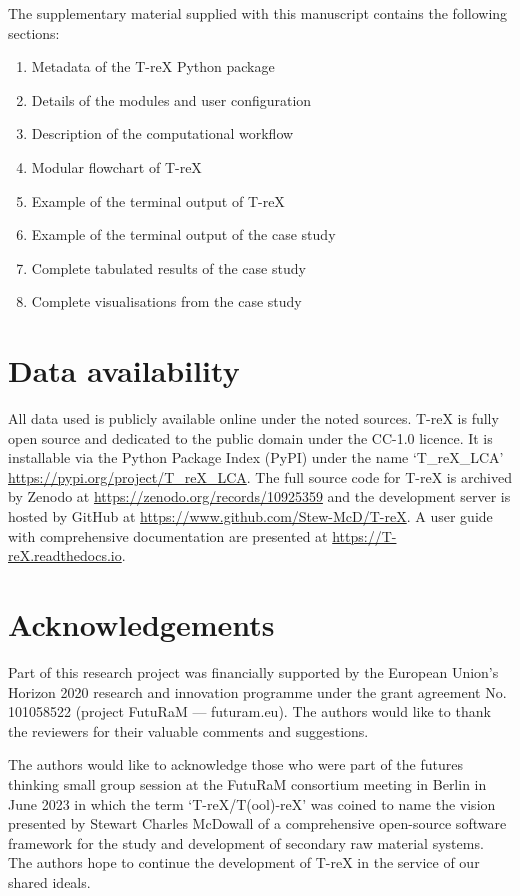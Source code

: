 \documentclass[a4paper,fleqn]{cas-dc}
\begin{document}
\appendix
The supplementary material supplied with this manuscript contains the
following sections:
\begin{enumerate}
	\item Metadata of the T-reX Python package\label{sec:supplementary-1}
	\item Details of the modules and user configuration\label{sec:supplementary-2}
	\item Description of the computational workflow\label{sec:supplementary-3}
	\item Modular flowchart of T-reX\label{sec:supplementary-4}
	\item Example of the terminal output of T-reX\label{sec:supplementary-5}
	\item Example of the terminal output of the case study\label{sec:supplementary-6}
	\item Complete tabulated results of the case study\label{sec:supplementary-7}
	\item Complete visualisations from the case study\label{sec:supplementary-8}
\end{enumerate}

\section*{Data availability}
All data used is publicly available online under the noted sources. T-reX is fully open source and dedicated to the public domain under the CC-1.0 licence. It is installable via the Python Package Index (PyPI) under the name `T\_reX\_LCA' \url{https://pypi.org/project/T_reX_LCA}.
The full source code for T-reX is archived by Zenodo at \url{https://zenodo.org/records/10925359} 
and the development server is hosted by GitHub at \url{https://www.github.com/Stew-McD/T-reX}. A user guide with comprehensive documentation are presented at \url{https://T-reX.readthedocs.io}.

\section*{Acknowledgements}
Part of this research project was financially supported by the European Union's Horizon 2020 research and innovation programme under the grant agreement No. 101058522 (project FutuRaM --- futuram.eu). The authors would like to thank the reviewers for their valuable comments and suggestions.

The authors would like to acknowledge those who were part of the futures
thinking small group session at the FutuRaM consortium meeting in Berlin in
June 2023 in which the term `T-reX/T(ool)-reX' was coined to name the vision
presented by Stewart Charles McDowall of a comprehensive open-source software
framework for the study and development of secondary raw material systems. The
authors hope to continue the development of T-reX in the service of our shared
ideals.
\end{document}
